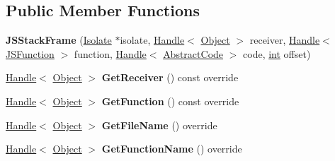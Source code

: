 \subsection*{Public Member Functions}
\begin{DoxyCompactItemize}
\item 
\mbox{\label{classv8_1_1internal_1_1JSStackFrame_a8b6ed4049fb39a6d8c9fa62fb8c38b10}} 
{\bfseries J\+S\+Stack\+Frame} (\mbox{\hyperlink{classv8_1_1internal_1_1Isolate}{Isolate}} $\ast$isolate, \mbox{\hyperlink{classv8_1_1internal_1_1Handle}{Handle}}$<$ \mbox{\hyperlink{classv8_1_1internal_1_1Object}{Object}} $>$ receiver, \mbox{\hyperlink{classv8_1_1internal_1_1Handle}{Handle}}$<$ \mbox{\hyperlink{classv8_1_1internal_1_1JSFunction}{J\+S\+Function}} $>$ function, \mbox{\hyperlink{classv8_1_1internal_1_1Handle}{Handle}}$<$ \mbox{\hyperlink{classv8_1_1internal_1_1AbstractCode}{Abstract\+Code}} $>$ code, \mbox{\hyperlink{classint}{int}} offset)
\item 
\mbox{\label{classv8_1_1internal_1_1JSStackFrame_a68b1b3a9d9d624895c319ecd1f8f2822}} 
\mbox{\hyperlink{classv8_1_1internal_1_1Handle}{Handle}}$<$ \mbox{\hyperlink{classv8_1_1internal_1_1Object}{Object}} $>$ {\bfseries Get\+Receiver} () const override
\item 
\mbox{\label{classv8_1_1internal_1_1JSStackFrame_acf55b0b6dd839bd2e900d50635d3aede}} 
\mbox{\hyperlink{classv8_1_1internal_1_1Handle}{Handle}}$<$ \mbox{\hyperlink{classv8_1_1internal_1_1Object}{Object}} $>$ {\bfseries Get\+Function} () const override
\item 
\mbox{\label{classv8_1_1internal_1_1JSStackFrame_a8aca8e326285ed94782e2dff00ed8bd1}} 
\mbox{\hyperlink{classv8_1_1internal_1_1Handle}{Handle}}$<$ \mbox{\hyperlink{classv8_1_1internal_1_1Object}{Object}} $>$ {\bfseries Get\+File\+Name} () override
\item 
\mbox{\label{classv8_1_1internal_1_1JSStackFrame_a248258b5699c0fcd976a0feaa07cabb7}} 
\mbox{\hyperlink{classv8_1_1internal_1_1Handle}{Handle}}$<$ \mbox{\hyperlink{classv8_1_1internal_1_1Object}{Object}} $>$ {\bfseries Get\+Function\+Name} () override
\item 

\end{DoxyCompactItemize}
